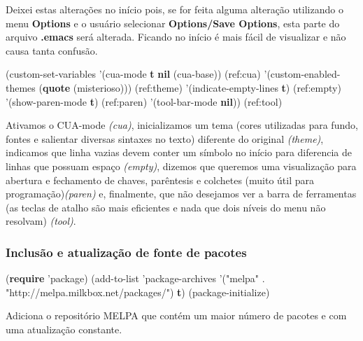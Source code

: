 \documentclass[]{article}
\newenvironment{Shaded}{}{}
\newcommand{\KeywordTok}[1]{\textcolor[rgb]{0.00,0.44,0.13}{\textbf{{#1}}}}
\newcommand{\StringTok}[1]{\textcolor[rgb]{0.25,0.44,0.63}{{#1}}}
\newcommand{\NormalTok}[1]{{#1}}
\begin{document}
Deixei estas alterações no início pois, se for feita alguma alteração
utilizando o menu \textbf{Options} e o usuário selecionar
\textbf{Options/Save Options}, esta parte do arquivo \textbf{.emacs}
será alterada. Ficando no início é mais fácil de visualizar e não causa
tanta confusão.

\begin{Shaded}
\begin{Highlighting}[]
\NormalTok{(custom-set-variables}
 \NormalTok{'(cua-mode }\KeywordTok{t} \KeywordTok{nil} \NormalTok{(cua-base)) (ref:cua)}
 \NormalTok{'(custom-enabled-themes (}\KeywordTok{quote} \NormalTok{(misterioso))) (ref:theme)}
 \NormalTok{'(indicate-empty-lines }\KeywordTok{t}\NormalTok{) (ref:empty)}
 \NormalTok{'(show-paren-mode }\KeywordTok{t}\NormalTok{) (ref:paren)}
 \NormalTok{'(tool-bar-mode }\KeywordTok{nil}\NormalTok{)) (ref:tool)}
\end{Highlighting}
\end{Shaded}

Ativamos o CUA-mode \emph{(cua)}, inicializamos um tema (cores
utilizadas para fundo, fontes e salientar diversas sintaxes no texto)
diferente do original \emph{(theme)}, indicamos que linha vazias devem
conter um símbolo no início para diferencia de linhas que possuam espaço
\emph{(empty)}, dizemos que queremos uma visualização para abertura e
fechamento de chaves, parêntesis e colchetes (muito útil para
programação)\emph{(paren)} e, finalmente, que não desejamos ver a barra
de ferramentas (as teclas de atalho são mais eficientes e nada que dois
níveis do menu não resolvam) \emph{(tool)}.

\subsubsection{Inclusão e atualização de fonte de
pacotes}\label{inclusuxe3o-e-atualizauxe7uxe3o-de-fonte-de-pacotes}

\begin{Shaded}
\begin{Highlighting}[]
\NormalTok{(}\KeywordTok{require} \NormalTok{'package)}
\NormalTok{(add-to-list 'package-archives}
             \NormalTok{'(}\StringTok{"melpa"} \NormalTok{. }\StringTok{"http://melpa.milkbox.net/packages/"}\NormalTok{)}
             \KeywordTok{t}\NormalTok{)}
\NormalTok{(package-initialize)}
\end{Highlighting}
\end{Shaded}

Adiciona o repositório MELPA que contém um maior número de pacotes e com
uma atualização constante.
\end{document}
